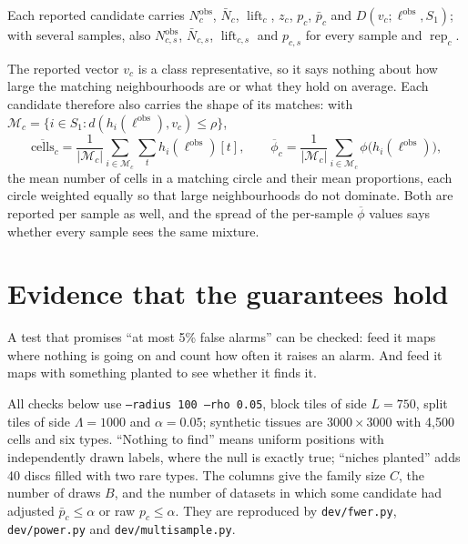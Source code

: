 \documentclass[11pt,a4paper]{article}
\theoremstyle{remark}
\newcommand{\lab}{\ell}
\newcommand{\obs}{\mathrm{obs}}
\newcommand{\lift}{\operatorname{lift}}
\newcommand{\rep}{\operatorname{rep}}
\begin{document}
Each reported candidate carries $N^{\obs}_c$, $\bar N_c$, $\lift_c$, $z_c$,
$p_c$, $\bar p_c$ and $D(v_c;\lab^{\obs},S_1)$; with several samples, also
$N^{\obs}_{c,s}$, $\bar N_{c,s}$, $\lift_{c,s}$ and $p_{c,s}$ for every sample
and $\rep_c$.

The reported vector $v_c$ is a class representative, so it says nothing about
how large the matching neighbourhoods are or what they hold on average. Each
candidate therefore also carries the shape of its matches: with
$\mathcal M_c=\{i\in S_1:d(h_i(\lab^{\obs}),v_c)\le\rho\}$,
\[
  \overline{\mathrm{cells}}_c=\frac1{|\mathcal M_c|}\sum_{i\in\mathcal M_c}\textstyle\sum_t h_i(\lab^{\obs})[t],
  \qquad
  \overline{\phi}_c=\frac1{|\mathcal M_c|}\sum_{i\in\mathcal M_c}\phi\bigl(h_i(\lab^{\obs})\bigr),
\]
the mean number of cells in a matching circle and their mean proportions, each
circle weighted equally so that large neighbourhoods do not dominate. Both are
reported per sample as well, and the spread of the per-sample $\overline\phi$
values says whether every sample sees the same mixture.

\section{Evidence that the guarantees hold}
\label{sec:evidence}

\begin{plain}
A test that promises ``at most 5\% false alarms'' can be checked: feed it maps
where nothing is going on and count how often it raises an alarm. And feed it
maps with something planted to see whether it finds it.
\end{plain}

All checks below use \texttt{--radius 100 --rho 0.05}, block tiles of side
$L=750$, split tiles of side $\Lambda=1000$ and $\alpha=0.05$; synthetic tissues
are $3000\times3000$ with 4{,}500 cells and six types. ``Nothing to find''
means uniform positions with independently drawn labels, where the null is
exactly true; ``niches planted'' adds 40 discs filled with two rare types.
The columns give the family size $C$, the number of draws $B$, and the number
of datasets in which some candidate had adjusted $\bar p_c\le\alpha$ or raw
$p_c\le\alpha$. They are reproduced by \texttt{dev/fwer.py},
\texttt{dev/power.py} and \texttt{dev/multisample.py}.
\end{document}
